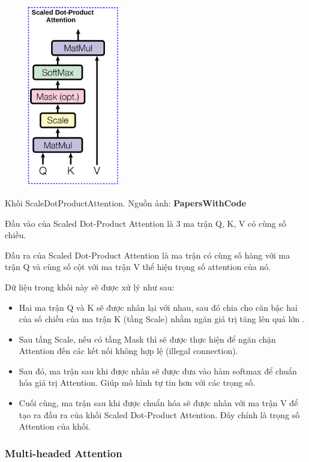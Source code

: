 \documentclass[a4paper, 10pt]{article}
\begin{document}
\begin{minipage}{\linewidth}
    \captionsetup{type=figure}
    \centering
    \includegraphics[width=6cm, height=8cm]{./ScaledDotProductAttention.png}
    \caption{Khối ScaleDotProductAttention. Nguồn ảnh: \textbf{PapersWithCode}}
\end{minipage}

Đầu vào của Scaled Dot-Product Attention là 3 ma trận Q, K, V có cùng số chiều.

Đầu ra của Scaled Dot-Product Attention là ma trận có cùng số hàng với ma trận Q và cùng số cột với ma trận V thể hiện trọng số attention của nó.

Dữ liệu trong khối này sẽ được xử lý như sau: \begin{itemize}
        \item Hai ma trận Q và K sẽ được nhân lại với nhau, sau đó chia cho căn bậc hai của số chiều 
        của ma trận K (tầng Scale) nhằm ngăn giá trị tăng lên quá lớn .
        \item Sau tầng Scale, nếu có tầng Mask thì sẽ được thực hiện để ngăn chặn Attention đến các kết nối không 
        hợp lệ (illegal connection).
        \item Sau đó, ma trận sau khi được nhân sẽ được đưa vào hàm softmax để chuẩn hóa giá trị Attention. Giúp mô hình tự tin hơn với các trọng số.
        \item Cuối cùng, ma trận sau khi được chuẩn hóa sẽ được nhân với ma trận V để tạo ra đầu ra của khối Scaled Dot-Product Attention. Đây chính là trọng số Attention của khối.
    \end{itemize} 

\subsubsection{Multi-headed Attention}
\end{document}
